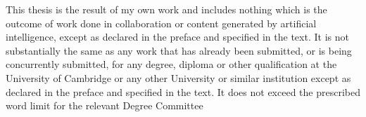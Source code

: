 
\begin{declaration}

This thesis is the result of my own work and includes nothing which is the outcome of work done in collaboration or content generated by artificial intelligence, except as declared in the preface and specified in the text. It is not substantially the same as any work that has already been submitted, or is being concurrently submitted, for any degree, diploma or other qualification at the University of Cambridge or any other University or similar institution except as declared in the preface and specified in the text. It does not exceed the prescribed word limit for the relevant Degree Committee


\end{declaration}

